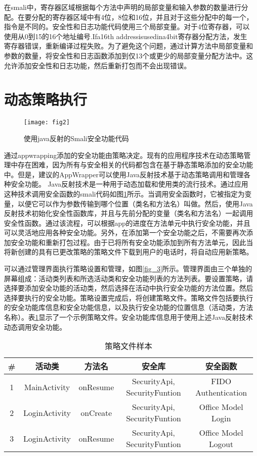 		在smali中，寄存器区域根据每个方法中声明的局部变量和输入参数的数量进行分配。在要分配的寄存器区域中有4位，8位和16位，并且对于这些分配中的每一个，指令是不同的。安全性和日志功能代码使用三个局部变量。对于4位寄存器，可以使用从0到15的16个地址编号.Ifa16th addressisusedina4bit寄存器分配方法，发生寄存器错误，重新编译过程失败。为了避免这个问题，通过计算方法中局部变量和参数的数量，将安全性和日志函数添加到仅13个或更少的局部变量分配方法中。这允许添加安全性和日志功能，然后重新打包而不会出现错误。

	\section{动态策略执行}
	
		\begin{figure}[hbt]
			\centering
			\texttt{[image: fig2]}
			\caption{使用java反射的Smali安全功能代码}
			\label{fig_2}
		\end{figure}

		通过appwrapping添加的安全功能由策略决定。现有的应用程序技术在动态策略管理中存在困难，因为所有与安全相关的代码都包含在基于静态策略添加的安全功能中。但是，建议的AppWrapper可以使用Java反射技术基于动态策略调用和管理各种安全功能。 Java反射技术是一种用于动态加载和使用类的流行技术。通过应用这种技术调用安全函数的smali代码如图\ref{fig_2}所示。当调用安全函数时，它被指定为变量，以便它可以作为参数传输到哪个位置（类名和方法名）叫做。然后，使用Java反射技术初始化安全性函数库，并且与先前分配的变量（类名和方法名）一起调用安全性函数。通过该流程，可以根据app的进度在方法单元中执行安全功能，并且可以灵活地应用各种安全功能。另外，在添加第一个安全功能之后，不需要再次添加安全功能和重新打包过程。由于已将所有安全功能添加到所有方法单元，因此当将新创建的具有已更改策略的策略文件下载到用户的电话时，将自动应用新策略。
				
		可以通过管理界面执行策略设置和管理，如图\ref{fig_3}所示。管理界面由三个单独的屏幕组成：活动类列表和所选活动类和安全功能列表的方法列表。要设置策略，请选择要添加安全功能的活动类，然后选择在活动中执行安全功能的方法位置。然后选择要执行的安全功能。策略设置完成后，将创建策略文件。策略文件包括要执行的安全功能库信息和安全功能信息，以及执行安全功能的位置信息（活动类，方法名称）。表\ref{tab1}显示了一个示例策略文件。安全功能库信息用于使用上述Java反射技术动态调用安全功能。
		
		\begin{table}
			\centering
			\caption{策略文件样本}
			\label{tab1}
			\begin{tabular}{|c|c|c|c|c|}
				\hline
				\# & 活动类 & 方法名 & 安全库 & 安全函数\\
				\hline
				1 & MainActivity & onResume & SecurityApi, SecurityFuntion & FIDO Authentication\\
				\hline
				2 & LoginActivity & onCreate & SecurityApi, SecurityFuntion & Office Model Login\\
				\hline
				3 & LoginActivity & onResume & SecurityApi, SecurityFuntion & Office Model Logout\\
				\hline
			\end{tabular}
		\end{table}

